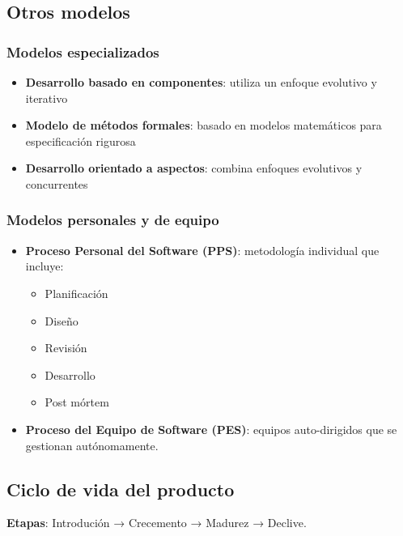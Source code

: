    \subsection{Otros modelos}\label{subsec:otros-modelos}

    \subsubsection{Modelos especializados}

    \begin{itemize}
        \item \textbf{Desarrollo basado en componentes}: utiliza un enfoque evolutivo y iterativo
        \item \textbf{Modelo de métodos formales}: basado en modelos matemáticos para especificación rigurosa
        \item \textbf{Desarrollo orientado a aspectos}: combina enfoques evolutivos y concurrentes
    \end{itemize}

    \subsubsection{Modelos personales y de equipo}

    \begin{itemize}
        \item \textbf{Proceso Personal del Software (PPS)}: metodología individual que incluye:
        \begin{itemize}
            \item Planificación
            \item Diseño
            \item Revisión
            \item Desarrollo
            \item Post mórtem
        \end{itemize}
        \item \textbf{Proceso del Equipo de Software (PES)}: equipos auto-dirigidos que se gestionan autónomamente.
    \end{itemize}


    \subsection{Ciclo de vida del producto}\label{subsec:ciclo-de-vida-del-producto}

    \textbf{Etapas}: Introdución → Crecemento → Madurez → Declive.